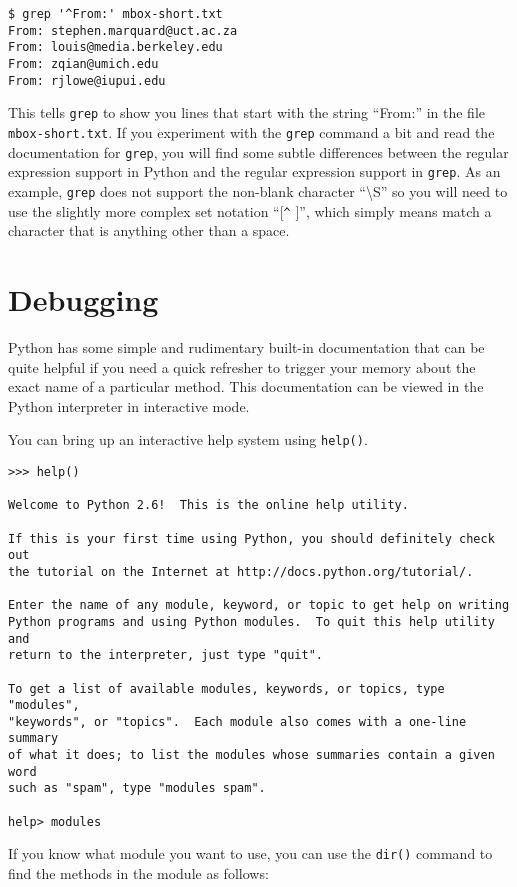 \beforeverb
\begin{verbatim}
$ grep '^From:' mbox-short.txt
From: stephen.marquard@uct.ac.za
From: louis@media.berkeley.edu
From: zqian@umich.edu
From: rjlowe@iupui.edu
\end{verbatim}
\afterverb
%
This tells {\tt grep} to show you lines that start with the string ``From:'' in the file
{\tt mbox-short.txt}.   If you experiment with the {\tt grep} command a bit and read the
documentation for {\tt grep}, you will find some subtle differences between the regular
expression support in Python and the regular expression support in {\tt grep}.  As an example,
{\tt grep} does not support the non-blank character ``{\textbackslash}S'' so you will need to
use the slightly more complex set notation ``[\verb"^" ]'', which simply means match a 
character that is anything other than a space.

\section{Debugging}

Python has some simple and rudimentary built-in documentation that can be quite helpful if
you need a quick refresher to trigger your memory about the exact name of a particular method.
This documentation can be viewed in the Python interpreter in interactive mode.

You can bring up an interactive help system using {\tt help()}.

\beforeverb
\begin{verbatim}
>>> help()

Welcome to Python 2.6!  This is the online help utility.

If this is your first time using Python, you should definitely check out
the tutorial on the Internet at http://docs.python.org/tutorial/.

Enter the name of any module, keyword, or topic to get help on writing
Python programs and using Python modules.  To quit this help utility and
return to the interpreter, just type "quit".

To get a list of available modules, keywords, or topics, type "modules",
"keywords", or "topics".  Each module also comes with a one-line summary
of what it does; to list the modules whose summaries contain a given word
such as "spam", type "modules spam".

help> modules
\end{verbatim}
\afterverb
%
If you know what module you want to use, you can use the {\tt dir()} command to find the methods in the module as follows:

